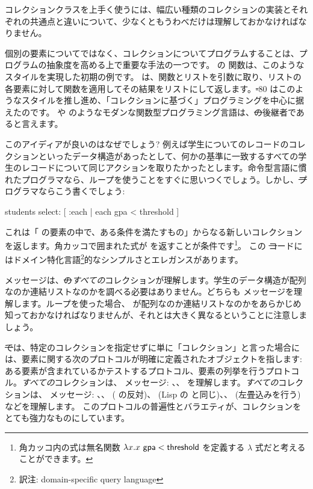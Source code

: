 \documentclass[a4paper,10pt,twoside]{book}
\begin{document}
コレクションクラスを上手く使うには、幅広い種類のコレクションの実装とそれぞれの共通点と違いについて、少なくともうわべだけは理解しておかなければなりません。

個別の要素についてではなく、コレクションについてプログラムすることは、プログラムの抽象度を高める上で重要な手法の一つです。
 の  関数は、このようなスタイルを実現した初期の例です。 は、関数とリストを引数に取り、リストの各要素に対して関数を適用してその結果をリストにして返します。\st-80 はこのようなスタイルを推し進め、「コレクションに基づく」プログラミングを中心に据えたのです。 や  のようなモダンな関数型プログラミング言語は、\st の後継者であると言えます。%

このアイディアが良いのはなぜでしょう?
例えば学生についてのレコードのコレクションといったデータ構造があったとして、何かの基準に一致するすべての学生のレコードについて同じアクションを取りたかったとします。命令型言語に慣れたプログラマなら、ループを使うことをすぐに思いつくでしょう。しかし、\st プログラマならこう書くでしょう:
\begin{code}{}
students select: [ :each | each gpa < threshold ]
\end{code}
\noindent
これは「 の要素の中で、ある条件を満たすもの」からなる新しいコレクションを返します。角カッコで囲まれた式が  を返すことが条件です\footnote{角カッコ内の式は無名関数 $\lambda x. x~{\sf gpa} < {\sf threshold}$ を定義する $\lambda$ 式だと考えることができます。
}。
この \st コードにはドメイン特化言語\footnote{訳注: domain-specific query language}的なシンプルさとエレガンスがあります。

 メッセージは、\st の\emph{すべての}コレクションが理解します。学生のデータ構造が配列なのか連結リストなのかを調べる必要はありません。どちらも  メッセージを理解します。ループを使った場合、 が配列なのか連結リストなのかをあらかじめ知っておかなければなりませんが、それとは大きく異なるということに注意しましょう。

\st では、特定のコレクションを指定せずに単に「コレクション」と言った場合には、要素に関する次のプロトコルが明確に定義されたオブジェクトを指します: ある要素が含まれているかテストするプロトコル、要素の列挙を行うプロトコル。\emph{すべての}コレクションは、 メッセージ: \mbox{、}\mbox{、} を理解します。\emph{すべての}コレクションは、 メッセージ: 、、 ( の反対)、 (Lisp の と同じ)、、 (左畳込みを行う) などを理解します。
このプロトコルの普遍性とバラエティが、コレクションをとても強力なものにしています。
\end{document}
